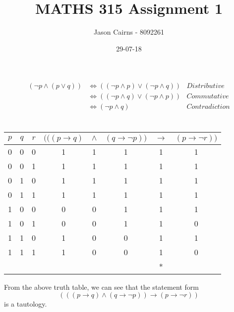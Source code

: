 \documentclass[11pt,oneside,a4paper]{article}
\begin{document}
\title{MATHS 315 Assignment 1}
\author{Jason Cairns - 8092261}
\date{29-07-18}
\maketitle

\section{}

\begin{align*}
(\neg p \wedge (p \vee q )) &\iff (( \neg p \wedge p ) \vee (\neg p \wedge q )) &\textit{Distributive}\\
&\iff  (( \neg p \wedge q ) \vee (\neg p \wedge p ))&\textit{Commutative}\\
&\iff (\neg p \wedge q ) &\textit{Contradiction}
\end{align*}

\section{}

\begin{table}[h]
\begin{tabular}{cccccccc}
\hline
\multicolumn{1}{|c}{$p$} & $q$ & \multicolumn{1}{c|}{$r$} & $(((p \to q)$ & $\wedge$ & \multicolumn{1}{c|}{$(q \to \neg p))$} & \multicolumn{1}{c|}{$\to$} & \multicolumn{1}{c|}{$(p \to \neg r))$} \\ \hline
\multicolumn{1}{|c}{0} & 0 & \multicolumn{1}{c|}{0} & 1 & 1 & \multicolumn{1}{c|}{1} & \multicolumn{1}{c|}{1} & \multicolumn{1}{c|}{1} \\
\multicolumn{1}{|c}{0} & 0 & \multicolumn{1}{c|}{1} & 1 & 1 & \multicolumn{1}{c|}{1} & \multicolumn{1}{c|}{1} & \multicolumn{1}{c|}{1} \\
\multicolumn{1}{|c}{0} & 1 & \multicolumn{1}{c|}{0} & 1 & 1 & \multicolumn{1}{c|}{1} & \multicolumn{1}{c|}{1} & \multicolumn{1}{c|}{1} \\
\multicolumn{1}{|c}{0} & 1 & \multicolumn{1}{c|}{1} & 1 & 1 & \multicolumn{1}{c|}{1} & \multicolumn{1}{c|}{1} & \multicolumn{1}{c|}{1} \\
\multicolumn{1}{|c}{1} & 0 & \multicolumn{1}{c|}{0} & 0 & 0 & \multicolumn{1}{c|}{1} & \multicolumn{1}{c|}{1} & \multicolumn{1}{c|}{1} \\
\multicolumn{1}{|c}{1} & 0 & \multicolumn{1}{c|}{1} & 0 & 0 & \multicolumn{1}{c|}{1} & \multicolumn{1}{c|}{1} & \multicolumn{1}{c|}{0} \\
\multicolumn{1}{|c}{1} & 1 & \multicolumn{1}{c|}{0} & 1 & 0 & \multicolumn{1}{c|}{0} & \multicolumn{1}{c|}{1} & \multicolumn{1}{c|}{1} \\
\multicolumn{1}{|c}{1} & 1 & \multicolumn{1}{c|}{1} & 1 & 0 & \multicolumn{1}{c|}{0} & \multicolumn{1}{c|}{1} & \multicolumn{1}{c|}{0} \\ \hline
 &  &  &  &  &  & * & 
\end{tabular}
\end{table}
From the above truth table, we can see that the statement form $$(((p \to q) \wedge (q \to \neg p)) \to (p \to \neg r))$$ is a tautology.
\end{document}
